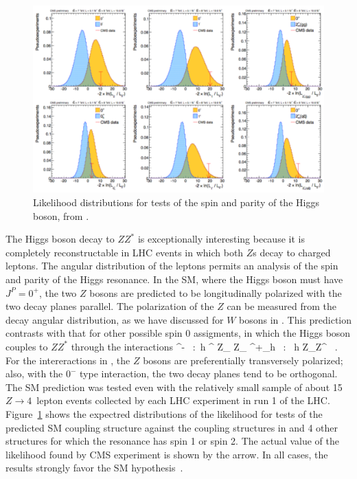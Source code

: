 \documentclass[12pt]{article}
\begin{document}
\begin{figure}
\begin{center}
\includegraphics[width=0.90\hsize]{hlikelihood.pdf}
\end{center}
\caption{Likelihood distributions for tests of the spin and parity of
  the Higgs boson, from \cite{CMSPASZZ}.}
\label{fig:CMSlike}
\end{figure}



The Higgs boson decay to $ZZ^*$ is exceptionally interesting because
it is completely reconstructable in LHC events in which both $Z$s decay to charged
leptons.    The angular distribution of the leptons permits an
analysis of the spin and parity of the Higgs resonance.   In the SM,
where the Higgs boson must have $J^P = 0^+$, the two $Z$ bosons are
predicted to be longitudinally polarized with the two decay planes
parallel. The polarization of the $Z$ can be measured from the decay
angular distribution, as we have discussed for $W$ bosons in
.   This prediction 
contrasts with that for  other possible spin 0 assigments, in
which the Higgs boson couples to $ZZ^*$ through the interactions
^- \ :\  h \eps^{\mu\nu\lambda\sigma} Z_{\mu\nu}
    Z_{\lambda\sigma} ^+_h \ : \   h Z_\mu\nu Z^{\mu\nu}   \ .
For the intereractions in , the $Z$ bosons are
preferentially transversely polarized; also, with   the $0^-$ type
interaction,
 the two decay  planes tend to be orthogonal.    The SM prediction was
 tested even with the relatively small sample of about 15 $Z\to
 4$~lepton events collected by each LHC experiment in run 1 of the LHC.
 Figure~\ref{fig:CMSlike} shows the expectred distributions of the
 likelihood
for tests
 of the predicted SM coupling structure against the  coupling
 structures in  and 4 other structures for which the
 resonance has spin 1 or spin 2.  The actual value of the likelihood
 found by CMS experiment  is shown by the arrow.   In all cases, the results
 strongly favor the SM hypothesis~\cite{CMSPASZZ}.
\end{document}
